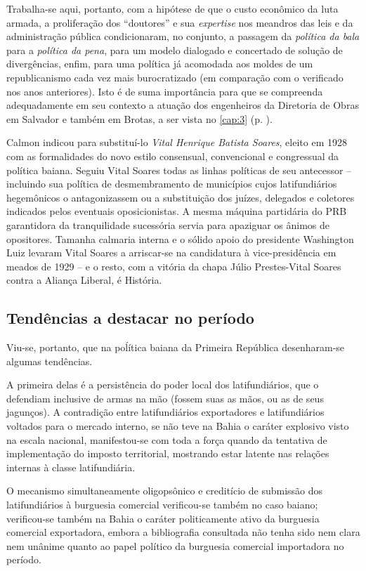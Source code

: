 Trabalha-se aqui, portanto, com a hipótese de que o custo econômico da luta armada, a proliferação dos ``doutores'' e sua \textit{expertise} nos meandros das leis e da administração pública condicionaram, no conjunto, a passagem da \textit{política da bala} para a \textit{política da pena}, para um modelo dialogado e concertado de solução de divergências, enfim, para uma política já acomodada aos moldes de um republicanismo cada vez mais burocratizado (em comparação com o verificado nos anos anteriores). Isto é de suma importância para que se compreenda adequadamente em seu contexto a atuação dos engenheiros da Diretoria de Obras em Salvador e também em Brotas, a ser vista no \autoref{cap:3} (p. \pageref{cap:3}).

Calmon indicou para substituí-lo \textit{Vital Henrique Batista Soares}, eleito em 1928 com as formalidades do novo estilo consensual, convencional e congressual da política baiana. Seguiu Vital Soares todas as linhas políticas de seu antecessor -- incluindo sua política de desmembramento de municípios cujos latifundiários hegemônicos o antagonizassem ou a substituição dos juízes, delegados e coletores indicados pelos eventuais oposicionistas. A mesma máquina partidária do PRB garantidora da tranquilidade sucessória servia para apaziguar os ânimos de opositores. Tamanha calmaria interna e o sólido apoio do presidente Washington Luiz levaram Vital Soares a arriscar-se na candidatura à vice-presidência em meados de 1929 -- e o resto, com a vitória da chapa Júlio Prestes-Vital Soares contra a Aliança Liberal, é História.

\subsection{Tendências a destacar no período}

Viu-se, portanto, que na poĺítica baiana da Primeira República desenharam-se algumas tendências.

A primeira delas é a persistência do poder local dos latifundiários, que o defendiam inclusive de armas na mão (fossem suas as mãos, ou as de seus jagunços). A contradição entre latifundiários exportadores e latifundiários voltados para o mercado interno, se não teve na Bahia o caráter explosivo visto na escala nacional, manifestou-se com toda a força quando da tentativa de implementação do imposto territorial, mostrando estar latente nas relações internas à classe latifundiária.

O mecanismo simultaneamente oligopsônico e creditício de submissão dos latifundiários à burguesia comercial verificou-se também no caso baiano; verificou-se também na Bahia o caráter politicamente ativo da burguesia comercial exportadora, embora a bibliografia consultada não tenha sido nem clara nem unânime quanto ao papel político da burguesia comercial importadora no período.

